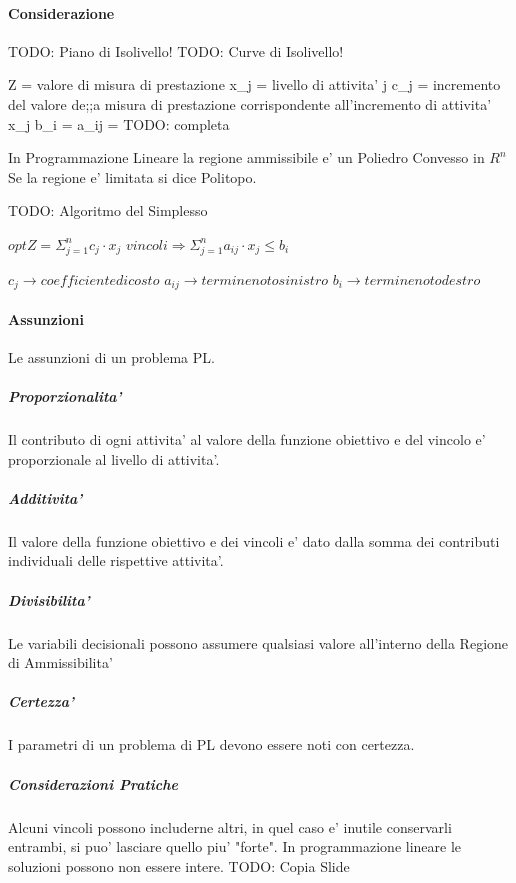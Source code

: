 \paragraph{Considerazione}

TODO: Piano di Isolivello!
TODO: Curve di Isolivello!

Z = valore di misura di prestazione
x_j = livello di attivita' j
c_j = incremento del valore de;;a misura di prestazione corrispondente all'incremento di attivita' x_j
b_i = 
a_{ij} = 
TODO: completa

In Programmazione Lineare la regione ammissibile e' un Poliedro Convesso in $R^n$
Se la regione e' limitata si dice Politopo.

TODO: Algoritmo del Simplesso

$opt Z = \Sigma _ {j=1} ^ {n} c_j \cdot x_j$
$vincoli \Rightarrow \Sigma _ {j=1} ^ {n} a_{ij} \cdot x_j \leq b_i$

$c_j \rightarrow coefficiente di costo$
$a_{ij} \rightarrow termine noto sinistro$
$b_{i} \rightarrow termine noto destro$

\paragraph{Assunzioni}
Le assunzioni di un problema PL.

\subparagraph{Proporzionalita'}
Il contributo di ogni attivita' al valore della funzione obiettivo e del vincolo e' proporzionale al livello di attivita'.

\subparagraph{Additivita'}
Il valore della funzione obiettivo e dei vincoli e' dato dalla somma dei contributi individuali delle rispettive attivita'.

\subparagraph{Divisibilita'}
Le variabili decisionali possono assumere qualsiasi valore all'interno della Regione di Ammissibilita'

\subparagraph{Certezza'}
I parametri di un problema di PL devono essere noti con certezza.

\subparagraph{Considerazioni Pratiche}

Alcuni vincoli possono includerne altri, in quel caso e' inutile conservarli entrambi, si puo' lasciare quello piu' "forte".
In programmazione lineare le soluzioni possono non essere intere.
TODO: Copia Slide

